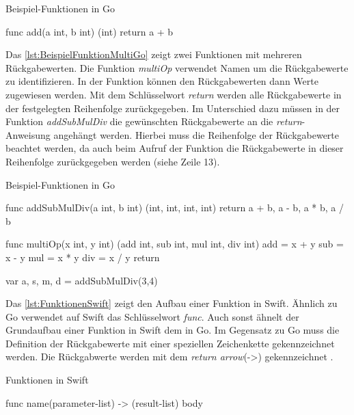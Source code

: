 \begin{listing}
\caption{Beispiel-Funktionen in Go}
\label{lst:BeispielFunktionGo}
\begin{GoCode}
func add(a int, b int) (int) {
    return a + b
}
\end{GoCode}
\end{listing}

Das \autoref{lst:BeispielFunktionMultiGo} zeigt zwei Funktionen mit mehreren Rückgabewerten.
Die Funktion \emph{multiOp} verwendet Namen um die Rückgabewerte zu identifizieren.
In der Funktion können den Rückgabewerten dann Werte zugewiesen werden.
Mit dem Schlüsselwort \emph{return} werden alle Rückgabewerte in der festgelegten Reihenfolge zurückgegeben.
Im Unterschied dazu müssen in der Funktion \emph{addSubMulDiv} die gewünschten Rückgabewerte an die \emph{return}-Anweisung angehängt werden.
Hierbei muss die Reihenfolge der Rückgabewerte beachtet werden, da auch beim Aufruf der Funktion die Rückgabewerte in dieser Reihenfolge zurückgegeben werden (siehe Zeile 13). 

\begin{listing}
\caption{Beispiel-Funktionen in Go}
\label{lst:BeispielFunktionMultiGo}
\begin{GoCode}
func addSubMulDiv(a int, b int) (int, int, int, int){
    return a + b, a - b, a * b, a / b
}

func multiOp(x int, y int) (add int, sub int, mul int, div int){
    add = x + y
    sub = x - y
    mul = x * y
    div = x / y
    return
}

var a, s, m, d = addSubMulDiv(3,4)
\end{GoCode}
\end{listing}

Das \autoref{lst:FunktionenSwift} zeigt den Aufbau einer Funktion in Swift. 
Ähnlich zu Go verwendet auf Swift das Schlüsselwort \emph{func}.
Auch sonst ähnelt der Grundaufbau einer Funktion in Swift dem in Go.
Im Gegensatz zu Go muss die Definition der Rückgabewerte mit einer speziellen Zeichenkette gekennzeichnet werden.
Die Rückgabwerte werden mit dem \emph{return arrow}(->) gekennzeichnet \cite{Apple.2017}.

\begin{listing}
\caption{Funktionen in Swift}
\label{lst:FunktionenSwift}
\begin{SwiftCode}
func name(parameter-list) -> (result-list){
    body
}
\end{SwiftCode}
\end{listing}

